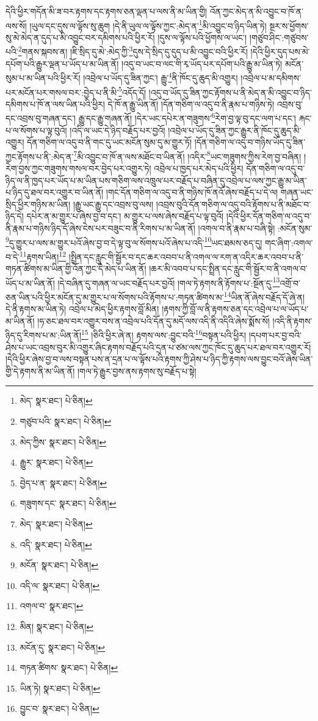 དེའི་ཕྱིར་གདོན་མི་ཟ་བར་རྟགས་དང་རྟགས་ཅན་ལྡན་པ་ལས་ནི་མ་ཡིན་གྱི། འོན་ཀྱང་མེད་ན་མི་འབྱུང་བ་ཁོ་ན་ལས་སོ། །ཡུལ་དང་དུས་ལ་ལྟོས་སུ་ཆུག །དེ་ནི་ཡུལ་ལ་ལྟོས་ཀྱང་:མེད་ན་\footnote{མེད་  སྣར་ཐང་།  པེ་ཅིན། }མི་འབྱུང་བ་ཉིད་ཡིན་ཏེ། སྔར་ས་ཕྱོགས་སུ་མེ་མེད་ན་དུད་པ་མི་འབྱུང་བར་དམིགས་པའི་ཕྱིར་རོ། །དུས་ལ་ལྟོས་པའི་ཕྱོགས་ལ་ཡང་། །གཙུབ་ཤིང་:གཙུབས་པའི་\footnote{གཙུབ་པའི་  སྣར་ཐང་།  པེ་ཅིན། }གནས་སྐབས་ན། །ཇི་སྲིད་དུ་མེ་:མེད་ཀྱི་\footnote{མེད་ཀྱིས་  སྣར་ཐང་།  པེ་ཅིན། }དུས་དེ་སྲིད་དུ་དུད་པ་མི་འབྱུང་བའི་ཕྱིར་རོ། །དེའི་ཕྱིར་དུད་པས་མེ་དཔོག་པའི་རྒྱུར་ལྡན་པ་ཡོད་པ་མ་ཡིན་ནོ། །འདུ་བ་ཡང་བ་ལང་གི་རྭ་ཡོད་པར་དཔོག་པའི་རྒྱུ་མ་ཡིན་ཏེ། མངོན་སུམ་པ་མ་ཡིན་པའི་ཕྱིར་རོ། །འབྲེལ་པ་ཡོད་དུ་ཟིན་ཀྱང་། རྒྱུ་\footnote{རྒྱུར་  སྣར་ཐང་།  པེ་ཅིན། }ནི་ཁོང་དུ་ཆུད་མི་འགྱུར། །འབྲེལ་པ་མ་དམིགས་པར་མངོན་པར་གསལ་བར་:བྱེད་པ་ནི་མི་\footnote{བྱེད་པ་ན་  སྣར་ཐང་།  པེ་ཅིན། }འདོད་དོ། །འདུ་བ་ཡོད་དུ་ཟིན་ཀྱང་རྟོགས་པ་ནི་མེད་ན་མི་འབྱུང་བ་ཉིད་དམིགས་པ་ཁོ་ན་ལས་ཡིན་པའི་ཕྱིར། དེ་ཁོ་ན་རྒྱུ་ཡིན་ནོ། །དོན་གཅིག་ལ་འདུ་བ་ནི་རྣམ་པ་གཉིས་ཏེ། འབྲས་བུ་དང་འབྲས་བུ་གཞན་དང་། རྒྱུ་དང་རྒྱུ་གཞན་ནོ། །དེར་ཡང་དཔེར་ན་གཟུགས་\footnote{གཟུགས་དང་  སྣར་ཐང་།  པེ་ཅིན། }རེག་བྱ་ལྟ་བུ་དང་ལག་པ་དང་། རྐང་པ་ལ་སོགས་པ་ལྟ་བུའོ། །འདི་ལ་ཡང་དེ་ཉིད་བརྗོད་པར་བྱའོ། །འབྲེལ་པ་ཡོད་དུ་ཟིན་ཀྱང་རྒྱུར་ནི་ཁོང་དུ་ཆུད་མི་འགྱུར། དོན་གཅིག་ལ་འདུ་བ་ནི་གང་དུ་ཡང་མངོན་སུམ་དུ་མ་གྱུར་ཏོ། །དོན་གཅིག་ལ་འདུ་བ་གཉིས་ཡོད་དུ་ཟིན་ཀྱང་རྟོགས་པ་ནི་:མེད་ན་\footnote{མེད་  སྣར་ཐང་།  པེ་ཅིན། }མི་འབྱུང་བ་ཁོ་ན་ལས་མཐོང་བ་ཡིན་ནོ། །འདིར་\footnote{འདི་  སྣར་ཐང་།  པེ་ཅིན། }ཡང་གཟུགས་ཀྱིས་རེག་བྱ་བཞིན། །རེག་བྱས་ཀྱང་གཟུགས་གསལ་བར་བྱེད་པར་འགྱུར་ཏེ། འབྲེལ་པ་ཁྱད་པར་མེད་པའི་ཕྱིར། དོན་གཅིག་ལ་འདུ་བ་ཉིད་ལ་ནི་ཁྱད་པར་ཡོད་པ་མ་ཡིན་པས་གཅིག་ལས་འཁྲུལ་པར་བརྗོད་པ་བཞིན་དུ་འབྲེལ་པ་ལས་ཀྱང་རྒྱུ་མ་ཡིན་པ་ཉིད་དུ་ཐལ་བར་འགྱུར་བ་ཡིན་ནོ། །གང་དོན་གཅིག་ལ་འདུ་བ་ནི་གཉིས་ཁོ་ནའོ་ཞེས་བརྗོད་པ་དེ་ལ། གཞན་ཡང་སྲིད་ཕྱིར་གཉིས་མ་ཡིན། །རྒྱུ་ཡང་རྒྱུ་དང་འབྲས་བུ་ལས། །འབྲས་བུའི་དོན་གཅིག་ལ་འདུ་བའི་རྟོགས་པ་ནི་མཐོང་བ་ཉིད་དེ། དཔེར་ན་མ་གྱུར་པ་ཞེས་བྱ་བ་དང་། མ་གྱུར་པ་ལས་ཞེས་བརྗོད་པ་ལྟ་བུའོ། །དེའི་ཕྱིར་དོན་གཅིག་ལ་འདུ་བ་ནི་རྣམ་པ་གཉིས་ཉིད་དོ་ཞེས་ངེས་པར་བཟུང་བ་ནི་རིགས་པ་མ་ཡིན་ནོ། །འགལ་བ་ནི་རྣམ་པ་བཞི་སྟེ། :མངོན་སུམ་\footnote{མངོན་  སྣར་ཐང་།  པེ་ཅིན། }དུ་གྱུར་པ་ལས་མ་གྱུར་པའོ་ཞེས་བྱ་བ་དེ་ལྟ་བུ་ལ་སོགས་པའོ་ཞེས་པ་འདི་\footnote{འདི་ལ་  སྣར་ཐང་།  པེ་ཅིན། }ཡང་ཐམས་ཅད་དུ། གང་ཞིག་:འགལ་བ་དེ་\footnote{འགལ་བ་  སྣར་ཐང་། }རྟགས་ཡིན།\footnote{མིན།  སྣར་ཐང་།  པེ་ཅིན། } །སྤྲིན་དང་རླུང་གི་སྦྱོར་བ་དང་ཆར་འབབ་པ་ནི་འགལ་ལ་རག་ན་འདིར་ཆར་འབབ་པ་ནི་གཏན་ཚིགས་མ་ཡིན་གྱི་འོན་ཀྱང་དེ་མེད་པ་ཡིན་ནོ། །ཆར་མི་འབབ་པ་དང་སྤྲིན་དང་རླུང་གི་སྦྱོར་བ་ནི་འགལ་བ་ཡོད་པ་མ་ཡིན་ནོ། །དེ་བཞིན་དུ་གཞན་ལ་ཡང་བརྗོད་པར་བྱའོ། །གལ་ཏེ་རྟགས་ནི་རྟོགས་པ་:སྔོན་དུ་\footnote{མངོན་དུ་  སྣར་ཐང་།  པེ་ཅིན། }འགྲོ་བ་ཅན་ཡིན་པའི་ཕྱིར་མངོན་དུ་མ་གྱུར་པ་ལ་སོགས་པའི་རྟོགས་པ་:གཏན་ཚིགས་མ་\footnote{གཏན་ཚིགས་  སྣར་ཐང་།  པེ་ཅིན། }ཡིན་ནོ་ཞེས་བརྗོད་དོ་ཞེ་ན། དེ་ནི་རྟགས་མ་ཡིན་ཏེ། འབྲེལ་པ་མེད་ཕྱིར་རྟགས་བློ་མིན། །རྟགས་ཀྱི་བློ་ལ་ནི་རྟགས་ཅན་དང་འབྲེལ་པ་ལ་ཡོད་པ་མ་ཡིན་ནོ། །ཧ་ཅང་ཐལ་བར་འགྱུར་བས་ན་འབྲེལ་པའི་དོན་དུ་མདོ་ལས་འདི་ནི་འདིའི་ཞེས་སྨོས་སོ། །འདི་ནི་རྟགས་ཉིད་དུ་རིགས་པ་མ་:ཡིན་ནོ།\footnote{ཡིན་ཏེ།  སྣར་ཐང་།  པེ་ཅིན། } །ཅིའི་ཕྱིར་ཞེ་ན། རྟགས་ལས་:བྱུང་བའི་\footnote{བྱུང་བ་  སྣར་ཐང་།  པེ་ཅིན། }བསྟན་པའི་ཕྱིར། །དཔག་པར་བྱ་བའི་ཤེས་པ་ཡང་འབྲས་བུར་མི་འགྱུར་ཞིང་རྟགས་བརྗོད་པའི་དྲན་པ་ཙམ་ལས་ཀྱང་ཁོང་དུ་ཆུད་པར་ཐལ་བར་འགྱུར་རོ། །དེའི་ཕྱིར་ཞེས་བྱ་བ་ལས་བསྟན་པས་ན་དྲན་པ་ལ་ལྟོས་པའི་རྟགས་ཀྱི་ཤེས་པ་ཉིད་ཀྱི་རྟགས་ལས་བྱུང་བའོ་ཞེས་ཡིན་གྱི་དེ་རྟགས་ནི་མ་ཡིན་ནོ། །གལ་ཏེ་རྒྱུར་བྱས་ནས་རྟགས་སུ་བརྗོད་པ་སྟེ། 